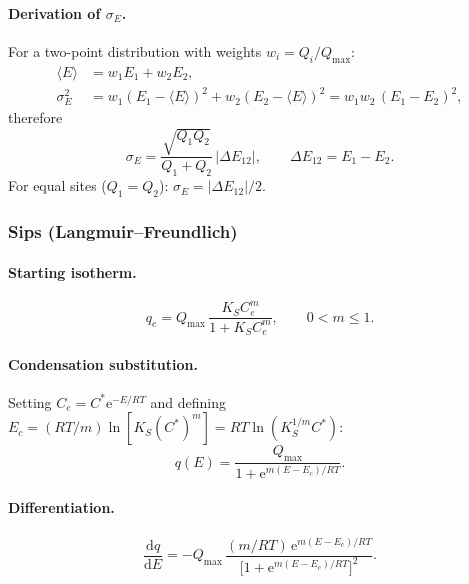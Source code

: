 \documentclass[journal=aamick,manuscript=article]{achemso}
\begin{document}
\paragraph{Derivation of $\sigma_E$.}
For a two-point distribution with weights $w_i = Q_i/Q_{\max}$:
\begin{align}
	\langle E \rangle &= w_1 E_1 + w_2 E_2, \\
	\sigma_E^2 &= w_1(E_1-\langle E\rangle)^2 + w_2(E_2-\langle E\rangle)^2
	           = w_1 w_2\,(E_1-E_2)^2,
\end{align}
therefore
\begin{equation}
	\sigma_E = \frac{\sqrt{Q_1 Q_2}}{Q_1+Q_2}\,|\Delta E_{12}|,
	\qquad \Delta E_{12} = E_1 - E_2.
	\label{eq:si_sigmaE_DL}
\end{equation}
For equal sites ($Q_1=Q_2$): $\sigma_E = |\Delta E_{12}|/2$.

\subsubsection{Sips (Langmuir--Freundlich)}
\label{sec:si_sips_dist}

\paragraph{Starting isotherm.}
\begin{equation}
	q_e = Q_{\max}\,\frac{K_S C_e^{m}}{1 + K_S C_e^{m}},
	\qquad 0 < m \leq 1.
\end{equation}

\paragraph{Condensation substitution.}
Setting $C_e = C^{\ast}\mathrm{e}^{-E/RT}$ and defining
$E_c = (RT/m)\ln[K_S(C^{\ast})^{m}] = RT\ln(K_S^{1/m}C^{\ast})$:
\begin{equation}
	q(E) = \frac{Q_{\max}}{1+\mathrm{e}^{m(E-E_c)/RT}}.
\end{equation}

\paragraph{Differentiation.}
\begin{equation}
	\frac{\mathrm{d}q}{\mathrm{d}E}
	= -Q_{\max}\,\frac{(m/RT)\,\mathrm{e}^{m(E-E_c)/RT}}
	           {\bigl[1+\mathrm{e}^{m(E-E_c)/RT}\bigr]^{2}}.
\end{equation}
\end{document}
